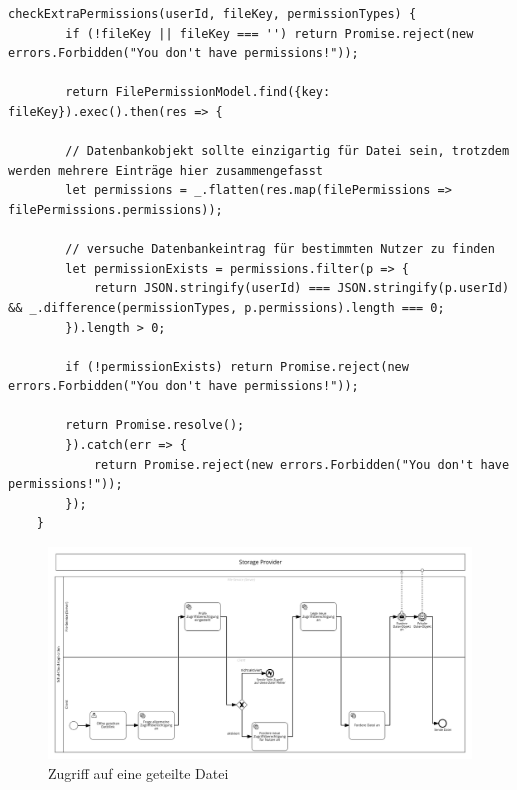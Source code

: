\begin{lstlisting}[caption=checkExtraPermissions() Funktion des filePermissionHelper, label=code:fphextra]
	checkExtraPermissions(userId, fileKey, permissionTypes) {
		if (!fileKey || fileKey === '') return Promise.reject(new errors.Forbidden("You don't have permissions!"));
	
		return FilePermissionModel.find({key: fileKey}).exec().then(res => {
		
		// Datenbankobjekt sollte einzigartig für Datei sein, trotzdem werden mehrere Einträge hier zusammengefasst
		let permissions = _.flatten(res.map(filePermissions => filePermissions.permissions));
	
		// versuche Datenbankeintrag für bestimmten Nutzer zu finden
		let permissionExists = permissions.filter(p => {
			return JSON.stringify(userId) === JSON.stringify(p.userId) && _.difference(permissionTypes, p.permissions).length === 0;
		}).length > 0;
	
		if (!permissionExists) return Promise.reject(new errors.Forbidden("You don't have permissions!"));
	
		return Promise.resolve();
		}).catch(err => {
			return Promise.reject(new errors.Forbidden("You don't have permissions!"));
		});
	}
\end{lstlisting}

\begin{figure}[H]
	\includegraphics[width=1.3\linewidth, angle=270]{images/filesharingusing}
	\caption[Caption for concept]{Zugriff auf eine geteilte Datei\footnotemark}
	\centering
	\label{fig:filesharingusing}
\end{figure}

